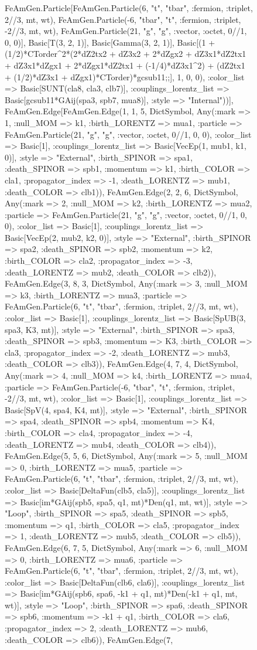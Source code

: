 \documentclass{revtex4}
\begin{document}
\begin{figure}[!htb]
\begin{center}
{FeAmGen.Particle[FeAmGen.Particle(6, "t", "tbar", :fermion, :triplet, 2//3, mt, wt), FeAmGen.Particle(-6, "tbar", "t", :fermion, :triplet, -2//3, mt, wt), FeAmGen.Particle(21, "g", "g", :vector, :octet, 0//1, 0, 0)], Basic[T(3, 2, 1)], Basic[Gamma(3, 2, 1)], Basic[(1 + (1/2)*CTorder^2*(2*dZ2tx2 + dZ3x2 + 2*dZgx2 + dZ3x1*dZ2tx1 + dZ3x1*dZgx1 + 2*dZgx1*dZ2tx1 + (-1/4)*dZ3x1^2) + (dZ2tx1 + (1/2)*dZ3x1 + dZgx1)*CTorder)*gcsub11;;], 1, 0, 0), :color_list => Basic[SUNT(cla8, cla3, clb7)], :couplings_lorentz_list => Basic[gcsub11*GAij(spa3, spb7, mua8)], :style => "Internal"))], FeAmGen.Edge[FeAmGen.Edge(1, 1, 5, Dict{Symbol, Any}(:mark => 1, :null_MOM => k1, :birth_LORENTZ => mua1, :particle => FeAmGen.Particle(21, "g", "g", :vector, :octet, 0//1, 0, 0), :color_list => Basic[1], :couplings_lorentz_list => Basic[VecEp(1, mub1, k1, 0)], :style => "External", :birth_SPINOR => spa1, :death_SPINOR => spb1, :momentum => k1, :birth_COLOR => cla1, :propagator_index => -1, :death_LORENTZ => mub1, :death_COLOR => clb1)), FeAmGen.Edge(2, 2, 6, Dict{Symbol, Any}(:mark => 2, :null_MOM => k2, :birth_LORENTZ => mua2, :particle => FeAmGen.Particle(21, "g", "g", :vector, :octet, 0//1, 0, 0), :color_list => Basic[1], :couplings_lorentz_list => Basic[VecEp(2, mub2, k2, 0)], :style => "External", :birth_SPINOR => spa2, :death_SPINOR => spb2, :momentum => k2, :birth_COLOR => cla2, :propagator_index => -3, :death_LORENTZ => mub2, :death_COLOR => clb2)), FeAmGen.Edge(3, 8, 3, Dict{Symbol, Any}(:mark => 3, :null_MOM => k3, :birth_LORENTZ => mua3, :particle => FeAmGen.Particle(6, "t", "tbar", :fermion, :triplet, 2//3, mt, wt), :color_list => Basic[1], :couplings_lorentz_list => Basic[SpUB(3, spa3, K3, mt)], :style => "External", :birth_SPINOR => spa3, :death_SPINOR => spb3, :momentum => K3, :birth_COLOR => cla3, :propagator_index => -2, :death_LORENTZ => mub3, :death_COLOR => clb3)), FeAmGen.Edge(4, 7, 4, Dict{Symbol, Any}(:mark => 4, :null_MOM => k4, :birth_LORENTZ => mua4, :particle => FeAmGen.Particle(-6, "tbar", "t", :fermion, :triplet, -2//3, mt, wt), :color_list => Basic[1], :couplings_lorentz_list => Basic[SpV(4, spa4, K4, mt)], :style => "External", :birth_SPINOR => spa4, :death_SPINOR => spb4, :momentum => K4, :birth_COLOR => cla4, :propagator_index => -4, :death_LORENTZ => mub4, :death_COLOR => clb4)), FeAmGen.Edge(5, 5, 6, Dict{Symbol, Any}(:mark => 5, :null_MOM => 0, :birth_LORENTZ => mua5, :particle => FeAmGen.Particle(6, "t", "tbar", :fermion, :triplet, 2//3, mt, wt), :color_list => Basic[DeltaFun(clb5, cla5)], :couplings_lorentz_list => Basic[im*GAij(spb5, spa5, q1, mt)*Den(q1, mt, wt)], :style => "Loop", :birth_SPINOR => spa5, :death_SPINOR => spb5, :momentum => q1, :birth_COLOR => cla5, :propagator_index => 1, :death_LORENTZ => mub5, :death_COLOR => clb5)), FeAmGen.Edge(6, 7, 5, Dict{Symbol, Any}(:mark => 6, :null_MOM => 0, :birth_LORENTZ => mua6, :particle => FeAmGen.Particle(6, "t", "tbar", :fermion, :triplet, 2//3, mt, wt), :color_list => Basic[DeltaFun(clb6, cla6)], :couplings_lorentz_list => Basic[im*GAij(spb6, spa6, -k1 + q1, mt)*Den(-k1 + q1, mt, wt)], :style => "Loop", :birth_SPINOR => spa6, :death_SPINOR => spb6, :momentum => -k1 + q1, :birth_COLOR => cla6, :propagator_index => 2, :death_LORENTZ => mub6, :death_COLOR => clb6)), FeAmGen.Edge(7, }
\end{center}
\end{figure}
\end{document}
